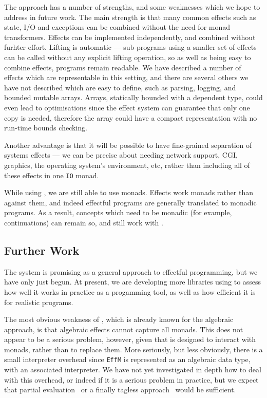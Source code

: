 The \Eff{} approach has a number of strengths, and some weaknesses which
we hope to address in future work. The main strength is that many
common effects such as state, I/O and exceptions can be combined without
the need for monad transformers. Effects can be implemented independently,
and combined without furhter effort. Lifting is automatic --- sub-programs
using a smaller set of effects can be called without any explicit lifting
operation, so as well as being easy to combine effects, programs
remain readable. We have described a number of effects which are representable
in this setting, and there are several others we have not described which
are easy to define, such as parsing, logging, and bounded mutable arrays.
Arrays, statically bounded with a dependent type, could even lead to optimisations
since the effect system can guarantee that only one copy is needed, therefore
the array could have a compact representation with no run-time bounds
checking.

Another advantage is that it will be possible to have fine-grained separation
of systems effects --- we can be precise about needing network support, CGI,
graphics, the operating system's environment, etc, rather than including all of
these effects in one \texttt{IO} monad.

While using \Eff{}, we are still able to use monads.  Effects work 
monads rather than against them, and indeed effectful programs are generally
translated to monadic
programs. As a result, concepts which need to be monadic (for example,
continuations) can remain so, and still work with \Eff{}.

\subsection*{Further Work}

The \Eff{} system is promising as a general approach to effectful programming,
but we have only just begun. At present, we are developing more libraries
using \Eff{} to assess how well it works in practice as a progamming tool,
as well as how efficient it is for realistic programs.

The most obvious weakness of \Eff{}, which is already known for the algebraic
approach, is that algebraic effects cannot capture all monads. This does not
appear to be a serious problem, however, given that \Eff{} is
designed to interact with monads, rather than to replace them. More seriously,
but less obviously, there is a small interpreter overhead since \texttt{EffM}
is represented as an algebraic data type, with an associated interpreter.  We
have not yet investigated in depth how to deal with this overhead, or indeed if
it is a serious problem in practice, but we expect that partial
evaluation~\cite{Brady2010} or a finally tagless approach~\cite{Carette2009}
would be sufficient. 

